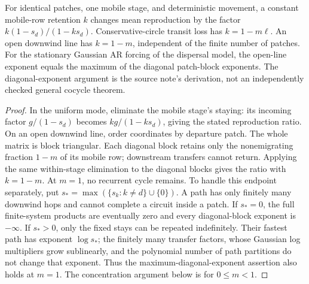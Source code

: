 \begin{lemma}\label{lem:mech-open}
For identical patches, one mobile stage, and deterministic movement, a constant mobile-row retention \(k\) changes mean reproduction by the factor \(k(1-s_d)/(1-ks_d)\). Conservative-circle transit loss has \(k=1-m\ell\). An open downwind line has \(k=1-m\), independent of the finite number of patches. For the stationary Gaussian AR forcing of the dispersal model, the open-line exponent equals the maximum of the diagonal patch-block exponents. The diagonal-exponent argument is the source note's derivation, not an independently checked general cocycle theorem.
\end{lemma}
\begin{proof}
In the uniform mode, eliminate the mobile stage's staying: its incoming factor \(g/(1-s_d)\) becomes \(kg/(1-ks_d)\), giving the stated reproduction ratio. On an open downwind line, order coordinates by departure patch. The whole matrix is block triangular. Each diagonal block retains only the nonemigrating fraction \(1-m\) of its mobile row; downstream transfers cannot return. Applying the same within-stage elimination to the diagonal blocks gives the ratio with \(k=1-m\). At \(m=1\), no recurrent cycle remains. To handle this endpoint separately, put \(s_* = \max(\{s_k:k\ne d\}\cup\{0\})\). A path has only finitely many downwind hops and cannot complete a circuit inside a patch. If \(s_*=0\), the full finite-system products are eventually zero and every diagonal-block exponent is \(-\infty\). If \(s_*>0\), only the fixed stays can be repeated indefinitely. Their fastest path has exponent \(\log s_*\); the finitely many transfer factors, whose Gaussian log multipliers grow sublinearly, and the polynomial number of path partitions do not change that exponent. Thus the maximum-diagonal-exponent assertion also holds at \(m=1\). The concentration argument below is for \(0\leq m<1\).


\end{proof}
